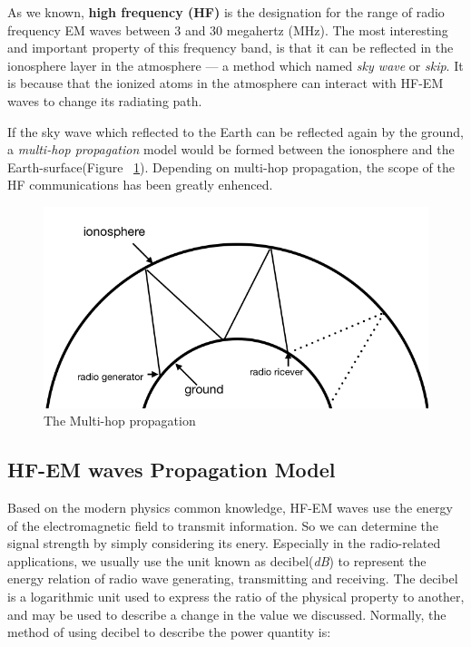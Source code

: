 \documentclass{mcmthesis}
\begin{document}
      As we known, \textbf{high frequency (HF)} is the designation for the range of radio frequency EM waves between 3 and 30 megahertz (MHz). The most interesting and important property of this frequency band, is that it can be reflected in the ionosphere layer in the atmosphere — a method which named \emph{sky wave} or \emph{skip}. It is because that the ionized atoms in the atmosphere can interact with HF-EM waves to change its radiating path.\cite{HF_EM}

      If the sky wave which reflected to the Earth can be reflected again by the ground, a \emph{multi-hop propagation} model would be formed between the ionosphere and the Earth-surface(Figure ~\ref{fig:Multi_hop}). Depending on multi-hop propagation, the scope of the HF communications has been greatly enhenced.

      \begin{figure}[ht]
      \centering
      \includegraphics[scale=0.5]{Multi_hop}
      \caption{The Multi-hop propagation}
      \label{fig:Multi_hop}
      \end{figure}


  \subsection{HF-EM waves Propagation Model}

    Based on the modern physics common knowledge, HF-EM waves use the energy of the electromagnetic field to transmit information. So we can determine the signal strength by simply considering its enery. Especially in the radio-related applications, we usually use the unit known as decibel(\emph{dB}) to represent the energy relation of radio wave generating, transmitting and receiving. The decibel is a logarithmic unit used to express the ratio of the physical property to another, and may be used to describe a change in the value we discussed. Normally, the method of using decibel to describe the power quantity is:
\end{document}
